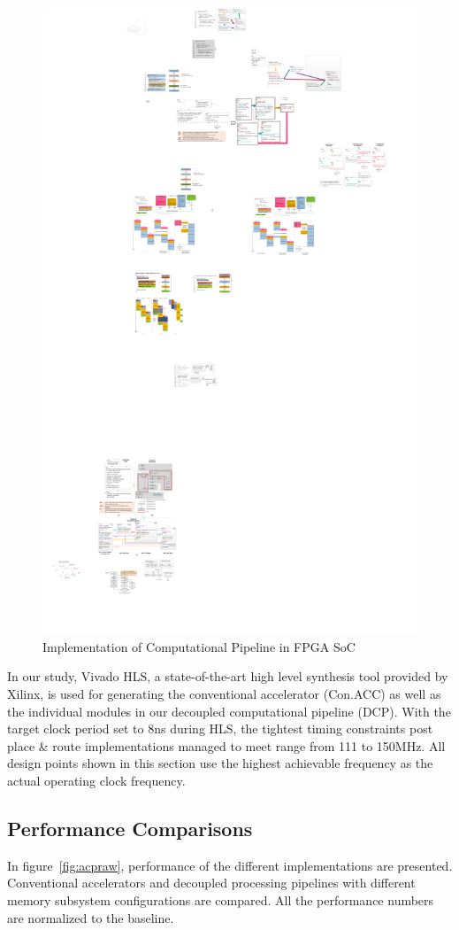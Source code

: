 \begin{figure}[htp]
\begin{center}
\includegraphics[width=0.7\linewidth]{chap3fig/ippf.pdf}
\caption{Implementation of Computational Pipeline in FPGA SoC  
\label{fig:ippf}}
\end{center}
\end{figure} 
In our study, Vivado HLS, a state-of-the-art high level synthesis tool provided by Xilinx,
is used for generating the conventional accelerator (Con.ACC) as well as the individual
modules in our decoupled computational pipeline (DCP). With the target clock period set to 
8ns during HLS, the tightest timing constraints post place \& route implementations managed to meet range from 111 to 150MHz. 
All design points shown in this section 
use the highest achievable frequency as the actual operating clock frequency. 

\subsection{Performance Comparisons}
In figure~\ref{fig:acpraw}, 
performance of the different implementations are presented. 
Conventional accelerators and decoupled processing pipelines with different memory subsystem
configurations are compared. All the performance numbers are normalized to the baseline.



